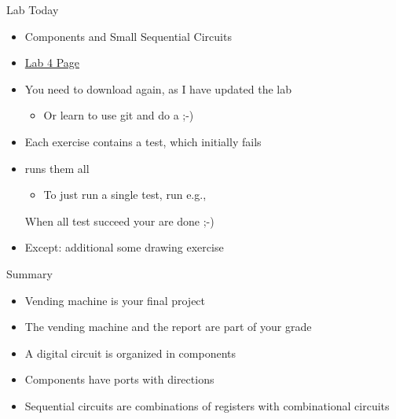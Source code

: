 \begin{frame}[fragile]{Lab Today}
\begin{itemize}
\item Components and Small Sequential Circuits
\item \href{https://github.com/schoeberl/chisel-lab/tree/master/lab4}{Lab 4 Page}
\item You need to download again, as I have updated the lab
\begin{itemize}
\item Or learn to use git and do a   ;-)
\end{itemize}
\item Each exercise contains a test, which initially fails
\item {} runs them all
\begin{itemize}
\item To just run a single test, run e.g.,\\
\end{itemize}
When all test succeed your are done ;-)
\item Except: additional some drawing exercise
\end{itemize}
\end{frame}

\begin{frame}[fragile]{Summary}
\begin{itemize}
\item Vending machine is your final project
\item The vending machine and the report are part of your grade
\item A digital circuit is organized in components
\item Components have ports with directions
\item Sequential circuits are combinations of registers with combinational circuits
\end{itemize}
\end{frame}


